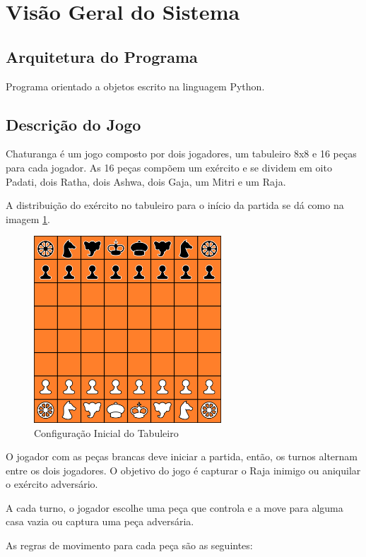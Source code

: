 \documentclass{article}
\begin{document}
\section{Visão Geral do Sistema}
\subsection{Arquitetura do Programa}
    Programa orientado a objetos escrito na linguagem Python.
    
\subsection{Descrição do Jogo}
    Chaturanga é um jogo composto por dois jogadores, um tabuleiro 8x8 e 16 peças para cada jogador.
    As 16 peças compõem um exército e se dividem em oito Padati, dois Ratha, dois Ashwa, dois Gaja, um Mitri e um Raja.
    
    A distribuição do exército no tabuleiro para o início da partida se dá como na imagem \ref{figura:initial_board}.
    
    \begin{figure}[h]
    \centering
    \includegraphics[width=7cm]{imgs/initial_board.png}
    \caption{Configuração Inicial do Tabuleiro}
    \label{figura:initial_board}
    \end{figure}

    O jogador com as peças brancas deve iniciar a partida, então, os turnos alternam entre os dois jogadores. O objetivo do jogo é capturar o Raja inimigo ou aniquilar o exército adversário.

    A cada turno, o jogador escolhe uma peça que controla e a move para alguma casa vazia ou captura uma peça adversária.
    
    As regras de movimento para cada peça são as seguintes:
\end{document}

